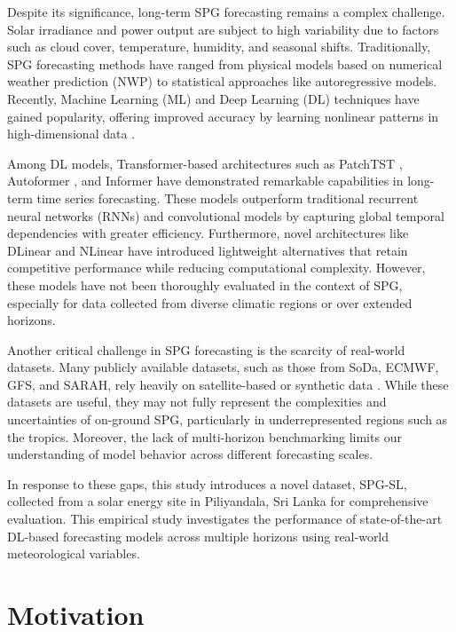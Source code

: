 \documentclass[12pt]{uomthesis}
\begin{document}
Despite its significance, long-term SPG forecasting remains a complex challenge. Solar irradiance and power output are subject to high variability due to factors such as cloud cover, temperature, humidity, and seasonal shifts. Traditionally, SPG forecasting methods have ranged from physical models based on numerical weather prediction (NWP) to statistical approaches like autoregressive models. Recently, Machine Learning (ML) and Deep Learning (DL) techniques have gained popularity, offering improved accuracy by learning nonlinear patterns in high-dimensional data \cite{ahmed2020review}.

Among DL models, Transformer-based architectures such as PatchTST \cite{nie2022patchtst}, Autoformer \cite{wu2021autoformer}, and Informer \cite{zhou2021informer} have demonstrated remarkable capabilities in long-term time series forecasting. These models outperform traditional recurrent neural networks (RNNs) and convolutional models by capturing global temporal dependencies with greater efficiency. Furthermore, novel architectures like DLinear and NLinear \cite{zeng2023transformers} have introduced lightweight alternatives that retain competitive performance while reducing computational complexity. However, these models have not been thoroughly evaluated in the context of SPG, especially for data collected from diverse climatic regions or over extended horizons.

Another critical challenge in SPG forecasting is the scarcity of real-world datasets. Many publicly available datasets, such as those from SoDa, ECMWF, GFS, and SARAH, rely heavily on satellite-based or synthetic data \cite{SoDa,ECMWF,GFS,SARAH}. While these datasets are useful, they may not fully represent the complexities and uncertainties of on-ground SPG, particularly in underrepresented regions such as the tropics. Moreover, the lack of multi-horizon benchmarking limits our understanding of model behavior across different forecasting scales.

In response to these gaps, this study introduces a novel dataset, SPG-SL, collected from a solar energy site in Piliyandala, Sri Lanka for comprehensive evaluation. This empirical study investigates the performance of state-of-the-art DL-based forecasting models across multiple horizons using real-world meteorological variables.

\section{Motivation}
\end{document}

